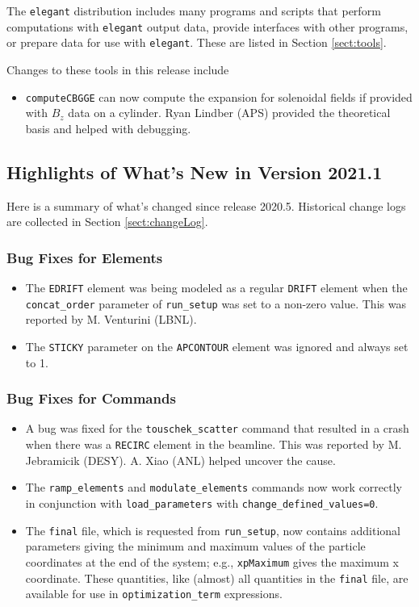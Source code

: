 \documentclass[11pt]{article}
\begin{document}
The {\tt elegant} distribution includes many programs and scripts that perform computations with {\tt elegant}
output data, provide interfaces with other programs, or prepare data for use with {\tt elegant}. These
are listed in Section \ref{sect:tools}. 

Changes to these tools in this release include
\begin{itemize}
\item \verb|computeCBGGE| can now compute the expansion for solenoidal fields if provided with $B_z$ data on 
  a cylinder. Ryan Lindber (APS) provided the theoretical basis and helped with debugging.
\end{itemize}

\subsection{Highlights of What's New in Version 2021.1}

Here is a summary of what's changed since release 2020.5.  Historical change logs are collected in Section
\ref{sect:changeLog}.

\subsubsection{Bug Fixes for Elements}

\begin{itemize}
\item The \verb|EDRIFT| element was being modeled as a regular \verb|DRIFT| element when the \verb|concat_order| parameter
  of \verb|run_setup| was set to a non-zero value. This was reported by M. Venturini (LBNL).
\item The \verb|STICKY| parameter on the \verb|APCONTOUR| element was ignored and always set to 1.
\end{itemize}

\subsubsection{Bug Fixes for Commands}
\begin{itemize}
\item A bug was fixed for the \verb|touschek_scatter| command that resulted in a crash when there was a
  \verb|RECIRC| element in the beamline. This was reported by M. Jebramicik (DESY). A. Xiao (ANL) helped
  uncover the cause.
\item The \verb|ramp_elements| and \verb|modulate_elements| commands now work correctly in conjunction
  with \verb|load_parameters| with \verb|change_defined_values=0|.
\item The \verb|final| file, which is requested from \verb|run_setup|, now contains additional parameters giving
  the minimum and maximum values of the particle coordinates at the end of the system; e.g., \verb|xpMaximum| gives
  the maximum x coordinate. These quantities, like (almost) all quantities in the \verb|final| file, are available
  for use in \verb|optimization_term| expressions.
\end{itemize}
\end{document}
